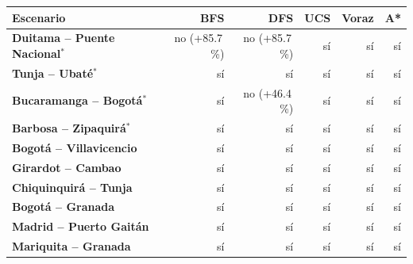 \renewcommand{\arraystretch}{1.2}
\begin{tabular}{|l|r|r|r|r|r|}
\hline
\rowcolor{gray!20} \textbf{Escenario} & \textbf{BFS} & \textbf{DFS} & \textbf{UCS} & \textbf{Voraz} & \textbf{A*} \\
\hline
\textbf{Duitama -- Puente Nacional$^{*}$} & no (+85.7\,\%) & no (+85.7\,\%) & sí & sí & sí \\
\hline
\textbf{Tunja -- Ubaté$^{*}$} & sí & sí & sí & sí & sí \\
\hline
\textbf{Bucaramanga -- Bogotá$^{*}$} & sí & no (+46.4\,\%) & sí & sí & sí \\
\hline
\textbf{Barbosa -- Zipaquirá$^{*}$} & sí & sí & sí & sí & sí \\
\hline
\textbf{Bogotá -- Villavicencio} & sí & sí & sí & sí & sí \\
\hline
\textbf{Girardot -- Cambao} & sí & sí & sí & sí & sí \\
\hline
\textbf{Chiquinquirá -- Tunja} & sí & sí & sí & sí & sí \\
\hline
\textbf{Bogotá -- Granada} & sí & sí & sí & sí & sí \\
\hline
\textbf{Madrid -- Puerto Gaitán} & sí & sí & sí & sí & sí \\
\hline
\textbf{Mariquita -- Granada} & sí & sí & sí & sí & sí \\
\hline
\end{tabular}
